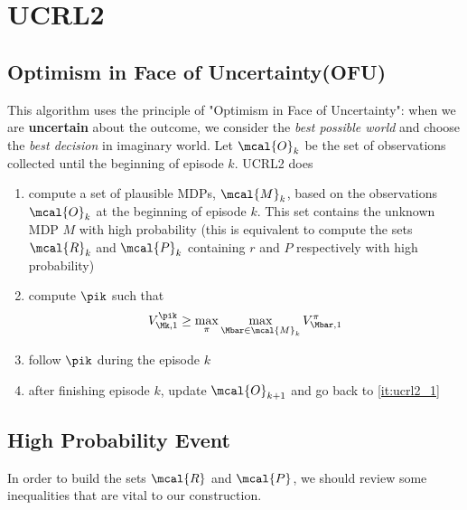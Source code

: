 \section{UCRL2}
\label{sec:ucrl2}

    \subsection{Optimism in Face of Uncertainty(OFU)}
    \label{subsec:OFU}
    
    This algorithm uses the principle of "Optimism in Face of Uncertainty": when we are \textbf{uncertain} about the outcome, we consider the \textit{best possible world} and choose the \textit{best decision} in imaginary world. Let $\mcal{O}_k$ be the set of observations collected until the beginning of episode $k$. UCRL2 does
        \begin{enumerate}
            \item \label{it:ucrl2_1} compute a set of plausible MDPs, $\mcal{M}_k$, based on the observations $\mcal{O}_k$ at the beginning of episode $k$. This set contains the unknown MDP $M$ with high probability (this is equivalent to compute the sets $\mcal{R}_k$ and $\mcal{P}_k$ containing $r$ and $P$ respectively with high probability)
            \item compute $\pik$ such that
                \begin{align}
                    V_{\Mk,1}^{\pik} \ge \max_{\pi}\max_{\Mbar\in\mcal{M}_k} V_{\Mbar,1}^\pi
                \end{align}
            \item follow $\pik$ during the episode $k$
            \item after finishing episode $k$, update $\mcal{O}_{k+1}$ and go back to \ref{it:ucrl2_1}
        \end{enumerate}
    
    \subsection{High Probability Event}
    \label{subsec:high_prob_event}
        In order to build the sets $\mcal{R}$ and $\mcal{P}$, we should review some inequalities that are vital to our construction.
    
